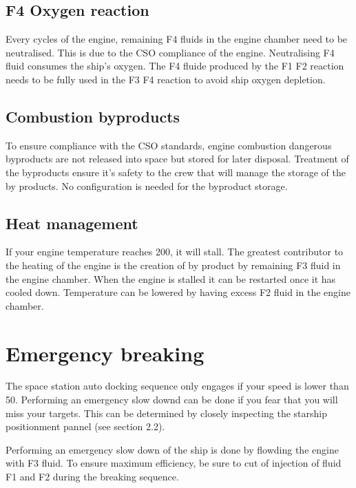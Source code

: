 \documentclass[12pt]{article}
\begin{document}
\newpage
\subsection{F4 Oxygen reaction}
Every cycles of the engine, remaining F4 fluids in the engine chamber need to be neutralised. This is due to the CSO compliance of the engine. Neutralising F4 fluid consumes the ship's oxygen. The F4 fluide produced by the F1 F2 reaction needs to be fully used in the F3 F4 reaction to avoid ship oxygen depletion.


\subsection{Combustion byproducts}
To ensure compliance with the CSO standards, engine combustion dangerous byproducts are not released into space but stored for later disposal. Treatment of the byproducts ensure it's safety to the crew that will manage the storage of the by products.
No configuration is needed for the byproduct storage.


\subsection{Heat management}
If your engine temperature reaches 200, it will stall. The greatest contributor to the heating of the engine is the creation of by product by remaining F3 fluid in the engine chamber. When the engine is stalled it can be restarted once it has cooled down. Temperature can be lowered by having excess F2 fluid in the engine chamber.


\newpage
\section{Emergency breaking}

The space station auto docking sequence only engages if your speed is lower than 50.
Performing an emergency slow downd can be done if you fear that you will miss your targets. This can be determined by closely inspecting the starship positionment pannel (see section 2.2).

Performing an emergency slow down of the ship is done by flowding the engine with F3 fluid. To ensure maximum efficiency, be sure to cut of injection of fluid F1 and F2 during the breaking sequence.
\end{document}
